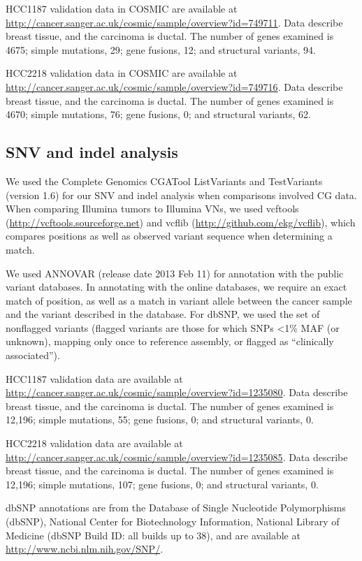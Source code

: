 HCC1187 validation data in COSMIC are available at \url{http://cancer.sanger.ac.uk/cosmic/sample/overview?id=749711}. Data describe breast tissue, and the carcinoma is ductal. The number of genes examined is 4675; simple mutations, 29; gene fusions, 12; and structural variants, 94.

HCC2218 validation data in COSMIC are available at \url{http://cancer.sanger.ac.uk/cosmic/sample/overview?id=749716}. Data describe breast tissue, and the carcinoma is ductal. The number of genes examined is 4670; simple mutations, 76; gene fusions, 0; and structural variants, 62.

\subsection*{SNV and indel analysis}

We used the Complete Genomics CGATool ListVariants and TestVariants (version 1.6) for our SNV and indel analysis when comparisons involved CG data. When comparing Illumina tumors to Illumina VNs, we used vcftools (\url{http://vcftools.sourceforge.net}) and vcflib (\url{http://github.com/ekg/vcflib}), which compares positions as well as observed variant sequence when determining a match.

We used ANNOVAR (release date 2013 Feb 11) for annotation with the public variant databases. In annotating with the online databases, we require an exact match of position, as well as a match in variant allele between the cancer sample and the variant described in the database. For dbSNP, we used the set of nonflagged variants (flagged variants are those for which SNPs <1\% MAF (or unknown), mapping only once to reference assembly, or flagged as “clinically associated”).

HCC1187 validation data are available at \url{http://cancer.sanger.ac.uk/cosmic/sample/overview?id=1235080}. Data describe breast tissue, and the carcinoma is ductal. The number of genes examined is 12,196; simple mutations, 55; gene fusions, 0; and structural variants, 0.

HCC2218 validation data are available at \url{http://cancer.sanger.ac.uk/cosmic/sample/overview?id=1235085}. Data describe breast tissue, and the carcinoma is ductal. The number of genes examined is 12,196; simple mutations, 107; gene fusions, 0; and structural variants, 0.

dbSNP annotations are from the Database of Single Nucleotide Polymorphisms (dbSNP), National Center for Biotechnology Information, National Library of Medicine (dbSNP Build ID: all builds up to 38), and are available at \url{http://www.ncbi.nlm.nih.gov/SNP/}.

